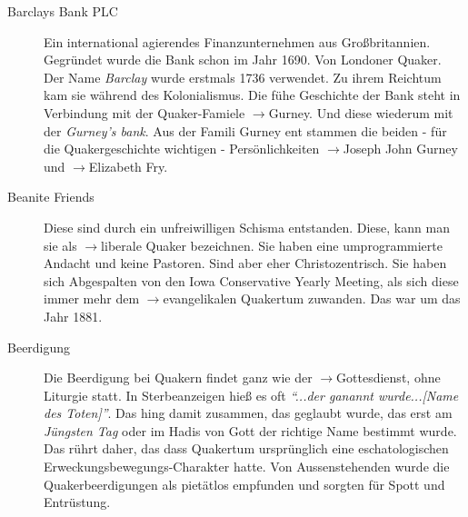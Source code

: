 \begin{description}
 \item[Barclays Bank PLC] Ein international agierendes Finanzunternehmen aus
Großbritannien. Gegründet wurde die Bank schon im Jahr 1690. Von Londoner
Quaker. Der Name \textit{Barclay} wurde erstmals 1736 verwendet. Zu ihrem
Reichtum kam sie während des Kolonialismus. Die fühe Geschichte der Bank steht
in Verbindung mit der Quaker-Famiele $\to$Gurney. Und diese wiederum mit der
\textit{Gurney's bank}. Aus der Famili  Gurney ent stammen die beiden - für die
Quakergeschichte wichtigen - Persönlichkeiten $\to$Joseph John Gurney und
$\to$Elizabeth Fry. 

 \item[Beanite Friends]
 Diese sind durch ein unfreiwilligen Schisma entstanden. Diese, kann man sie als
$\to$liberale Quaker bezeichnen. Sie haben eine umprogrammierte Andacht und
keine Pastoren. Sind aber eher Christozentrisch. Sie haben sich Abgespalten von
den Iowa Conservative Yearly Meeting, als sich diese immer mehr dem
$\to$evangelikalen Quakertum zuwanden. Das war um das Jahr 1881.
  


 \item[Beerdigung] Die Beerdigung bei Quakern findet ganz wie der
$\to$Gottesdienst, ohne Liturgie statt. In Sterbeanzeigen hieß es oft
\textit{"`...der ganannt wurde...[Name des Toten]"'}. Das hing damit zusammen,
das geglaubt wurde, das erst am \textit{Jüngsten Tag} oder im Hadis von Gott der
richtige Name bestimmt wurde. Das rührt daher, das dass Quakertum ursprünglich
eine eschatologischen Erweckungsbewegungs-Charakter hatte. Von Aussenstehenden
wurde die Quakerbeerdigungen als pietätlos empfunden und sorgten für Spott und
Entrüstung.  


\end{description}
